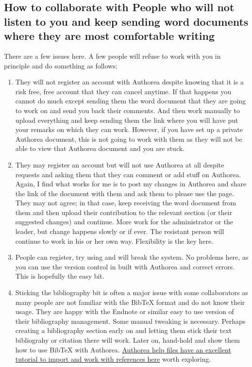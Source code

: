 \subsection{How to collaborate with People who will not listen to you and keep sending word documents where they are most comfortable writing}

There are a few issues here. A few people will refuse to work with you in principle and do something as follows:

\begin{enumerate}
\item They will not register an account with Authorea despite knowing that it is a risk free, free account that they can cancel anytime. If that happens you cannot do much except sending them the word document that they are going to work on and send you back their comments. And then work manually to upload everything and keep sending them the link where you will have put your remarks on which they can work. However, if you have set up a private Authorea document, this is not going to work with them as they will not be able to view that Authorea document and you are stuck. 
\item They may register an account but will not use Authorea at all despite requests and asking them that they can comment or add stuff on Authorea. Again, I find what works for me is to post my changes in Authorea and share the link of the document with them and ask them to please use the page. They may not agree; in that case, keep receiving the word document from them and then upload their contribution to the relevant section (or their suggested changes) and continue. More work for the administrator or the leader, but change happens slowly or if ever. The resistant person will continue to work in his or her own way. Flexibility is the key here. 
\item People can register, try using and will break the system. No problems here, as you can use the version control in built with Authorea and correct errors. This is hopefully the easy bit.
\item Sticking the bibliography bit is often a major issue with some collaborators as many people are not familiar with the BibTeX format and do not know their usage. They are happy with the Endnote or similar easy to use version of their bibliography management. Some manual tweaking is necessary. Perhaps creating a bibliography section early on and letting them stick their text bibliograhy or citation there will work. Later on, hand-hold and show them how to use BibTeX with Authorea. \href{https://www.authorea.com/users/9932/articles/12628/_show_article}{Authorea help files have an excellent tutorial to import and work with references here} worth exploring. 
\end{enumerate}

